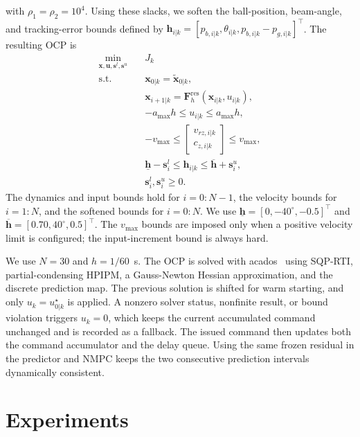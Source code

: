 \documentclass[letterpaper, 10 pt, conference]{ieeeconf}  %
\begin{document}
with $\rho_1=\rho_2=10^4$.
Using these slacks, we soften the ball-position, beam-angle, and tracking-error bounds defined by
$\mathbf h_{i|k}=[p_{b,i|k},\theta_{i|k},p_{b,i|k}-p_{g,i|k}]^\top$. The resulting OCP is
\begin{equation}
\begin{aligned}
    \min_{\mathbf x,\mathbf u,\mathbf s^l,\mathbf s^u}\quad
    &J_k\\
    \mathrm{s.t.}\quad
    &\mathbf x_{0|k}=\tilde{\mathbf x}_{0|k},\\
    &\mathbf x_{i+1|k}=\mathbf F_h^{\mathrm{res}}
    (\mathbf x_{i|k},u_{i|k}),\\
    &-a_{\max}h\leq u_{i|k}\leq a_{\max}h,\\
    &-v_{\max}\leq
    \begin{bmatrix}v_{rz,i|k}\\c_{z,i|k}\end{bmatrix}
    \leq v_{\max},\\
    &\underline{\mathbf h}-\mathbf s_i^l
    \leq\mathbf h_{i|k}
    \leq\overline{\mathbf h}+\mathbf s_i^u,\\
    &\mathbf s_i^l,\mathbf s_i^u\geq0.
\end{aligned}
    \label{eq:residual_aware_nmpc_ocp}
\end{equation}
The dynamics and input bounds hold for $i=0{:}N-1$, the velocity bounds for $i=1{:}N$, and the softened bounds
for $i=0{:}N$. We use
$\underline{\mathbf h}=[0,-40^\circ,-0.5]^\top$ and
$\overline{\mathbf h}=[0.70,40^\circ,0.5]^\top$. The
$v_{\max}$ bounds are imposed only when a positive velocity limit is configured; the input-increment bound is
always hard.

We use $N=30$ and $h=1/60$~s. The OCP is solved with acados~\cite{verschueren2022acados} using SQP-RTI,
partial-condensing HPIPM, a Gauss-Newton Hessian approximation, and the discrete prediction map. The previous
solution is shifted for warm starting, and only $u_k=u_{0|k}^{\star}$ is applied. A nonzero solver status,
nonfinite result, or bound violation triggers $u_k=0$, which keeps the current accumulated command unchanged and
is recorded as a fallback. The issued command then updates both the command accumulator and the delay queue.
Using the same frozen residual in the predictor and NMPC keeps the two consecutive prediction intervals
dynamically consistent.



\section{Experiments}
\label{sec:experiments}
\end{document}
